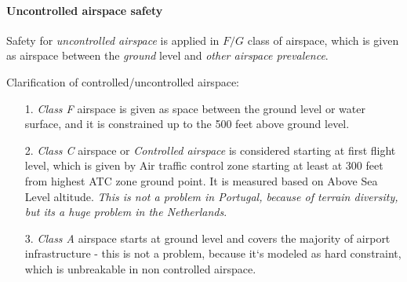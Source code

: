 \paragraph{Uncontrolled airspace safety}
\noindent Safety for \emph{uncontrolled airspace} is applied in $F/G$ class of airspace, which is given as airspace between the \emph{ground} level and \emph{other airspace prevalence}.
\begin{note}{Clarification of controlled/uncontrolled airspace:}
    \begin{itemize}
        \item[1.] \emph{Class F} airspace is given as space between the ground level or water surface, and it is constrained up to the 500 feet above ground level.
        \item[2.] \emph{Class C} airspace or \emph{Controlled airspace} is considered starting at first flight level, which is given by Air traffic control zone starting at least at 300 feet from highest ATC zone ground point. It is measured based on Above Sea Level altitude. \emph{This is not a problem in Portugal, because of terrain diversity, but its a huge problem in the Netherlands}.
        \item[3.] \emph{Class A} airspace starts at ground level and covers the majority of airport infrastructure - this is not a problem, because it`s modeled as hard constraint, which is unbreakable in non controlled airspace.
    \end{itemize}
\end{note}

